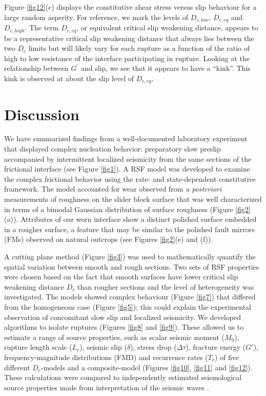 \documentclass[preprint,1p, 10pt,authoryear]{elsarticle}
\begin{document}
Figure \ref{fig12}(c) displays the constitutive shear stress versus slip behaviour for a large random asperity. For reference, we mark the levels of $D_{c,low}$, $D_{c,eq}$ and $D_{c, high}$.  The term $D_{c,eq}$, or equivalent critical slip weakening distance, appears to be a representative critical slip weakening distance that always lies between the two $D_{c}$ limits but will likely vary for each rupture as a function of the ratio of high to low resistance of the interface participating in rupture. Looking at the relationship between $G^{'}$ and slip, we see that it appears to have a ``kink''.  This kink is observed at about the slip level of $D_{c,eq}$. 

\section{Discussion}
We have summarized findings from a well-documented laboratory experiment \citep{Selvadurai2015, Selvadurai2017, Selvadurai2019} that displayed complex nucleation behavior: preparatory slow preslip accompanied by intermittent localized seismicity from the same sections of the frictional interface (see Figure \ref{fig1}). A RSF model was developed to examine the complex frictional behavior using the rate- and state-dependent constitutive framework. The model accounted for wear observed from \textit{a posteriori} measurements of roughness on the slider block surface that was well characterized in terms of a bimodal Gaussian distribution of surface roughness (Figure \ref{fig2}(a)). Attributes of our worn interface show a distinct polished surface embedded in a rougher surface, a feature that may be similar to the polished fault mirrors (FMs) observed on natural outcrops (see Figures \ref{fig2}(e) and (f)).

A cutting plane method (Figure \ref{fig3}) was used to mathematically quantify the spatial variation between smooth and rough sections. Two sets of RSF properties were chosen based on the fact that smooth surfaces have lower critical slip weakening distance $D_{c}$ than rougher sections and the level of heterogeneity was investigated. The models showed complex behaviour (Figure \ref{fig7}) that differed from the homogeneous case (Figure \ref{fig5}); this could explain the experimental observation of concomitant slow slip and localized seismicity.  We developed algorithms to isolate ruptures (Figures \ref{fig8} and \ref{fig9}).  These allowed us to estimate a range of source properties, such as scalar seismic moment ($M_{0}$), rupture length scale ($L_{r}$), seismic slip ($\delta$), stress drop ($\Delta\tau$), fracture energy ($G'$), frequency-magnitude distributions (FMD) and recurrence rates ($T_{r}$) of five different $D_{c}$-models and a composite-model (Figures \ref{fig10}, \ref{fig11} and \ref{fig12}). These calculations were compared to independently estimated seismological source properties made from interpretation of the seismic waves \citep{Selvadurai2019}.
\end{document}
